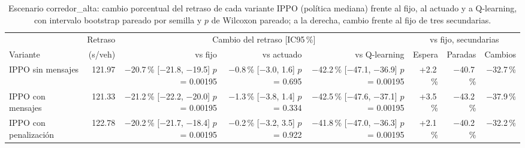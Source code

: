\begin{table}[H]
\centering
\scriptsize
\setlength{\tabcolsep}{3pt}
\begin{tabular}{lrrrrrrr}
\toprule
 & Retraso & \multicolumn{3}{c}{Cambio del retraso [IC95\,\%]} & \multicolumn{3}{c}{vs fijo, secundarias} \\
\cmidrule(lr){3-5}\cmidrule(lr){6-8}
Variante & (s/veh) & vs fijo & vs actuado & vs Q-learning & Espera & Paradas & Cambios \\
\midrule
IPPO sin mensajes & 121.97 & \makecell[r]{$-$20.7\,\%\\{}[$-$21.8, $-$19.5]\\$p$ = 0.00195} & \makecell[r]{$-$0.8\,\%\\{}[$-$3.0, 1.6]\\$p$ = 0.695} & \makecell[r]{$-$42.2\,\%\\{}[$-$47.1, $-$36.9]\\$p$ = 0.00195} & +2.2\,\% & $-$40.7\,\% & $-$32.7\,\% \\
IPPO con mensajes & 121.33 & \makecell[r]{$-$21.2\,\%\\{}[$-$22.2, $-$20.0]\\$p$ = 0.00195} & \makecell[r]{$-$1.3\,\%\\{}[$-$3.8, 1.4]\\$p$ = 0.334} & \makecell[r]{$-$42.5\,\%\\{}[$-$47.6, $-$37.1]\\$p$ = 0.00195} & +3.5\,\% & $-$43.2\,\% & $-$37.9\,\% \\
IPPO con penalización & 122.78 & \makecell[r]{$-$20.2\,\%\\{}[$-$21.7, $-$18.4]\\$p$ = 0.00195} & \makecell[r]{$-$0.2\,\%\\{}[$-$3.2, 3.5]\\$p$ = 0.922} & \makecell[r]{$-$41.8\,\%\\{}[$-$47.0, $-$36.3]\\$p$ = 0.00195} & +2.1\,\% & $-$40.2\,\% & $-$32.2\,\% \\
\bottomrule
\end{tabular}
\caption[Escenario corredor\_alta: cambio del retraso de las variantes IPPO]{Escenario corredor\_alta: cambio porcentual del retraso de cada variante IPPO (política mediana) frente al fijo, al actuado y a Q-learning, con intervalo bootstrap pareado por semilla y $p$ de Wilcoxon pareado; a la derecha, cambio frente al fijo de tres secundarias.}
\label{tab:corredor_alta-u4-deltas}
\end{table}
